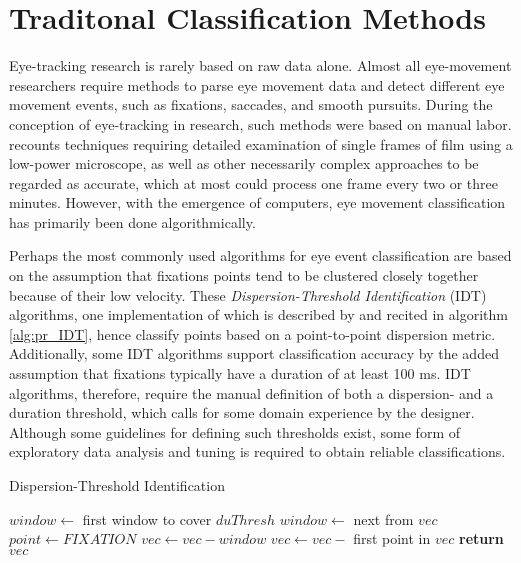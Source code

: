 \section{Traditonal Classification Methods} \label{sec:pr_TraditionalClassificationMethods}

Eye-tracking research is rarely based on raw data alone. Almost all eye-movement researchers require methods to parse eye movement data and detect different eye movement events, such as fixations, saccades, and smooth pursuits. During the conception of eye-tracking in research, such methods were based on manual labor. \cite{hartridge1948} recounts techniques requiring detailed examination of single frames of film using a low-power microscope, as well as other necessarily complex approaches to be regarded as accurate, which at most could process one frame every two or three minutes. However, with the emergence of computers, eye movement classification has primarily been done algorithmically. 

Perhaps the most commonly used algorithms for eye event classification are based on the assumption that fixations points tend to be clustered closely together because of their low velocity. These \textit{Dispersion-Threshold Identification} (IDT) algorithms, one implementation of which is described by \cite{salvucci2000} and recited in algorithm \ref{alg:pr_IDT}, hence classify points based on a point-to-point dispersion metric. Additionally, some IDT algorithms support classification accuracy by the added assumption that fixations typically have a duration of at least 100 ms. IDT algorithms, therefore, require the manual definition of both a dispersion- and a duration threshold, which calls for some domain experience by the designer. Although some guidelines for defining such thresholds exist, some form of exploratory data analysis and tuning is required to obtain reliable classifications.

\begin{algorithm}
    \caption{Dispersion-Threshold Identification}
    \label{alg:pr_IDT}
    \begin{algorithmic}[1]
                \State $window \gets$ first window to cover $duThresh$
                        \State $window \gets$ next from $vec$
                    \EndWhile
                        \State $point \gets FIXATION$
                    \EndFor
                    \State $vec \gets vec - window$
                \Else
                    \State $vec \gets vec - $ first point in $vec$
                \EndIf
            \EndWhile
            \State \textbf{return} $vec$
        \EndProcedure
    \end{algorithmic}
\end{algorithm}

